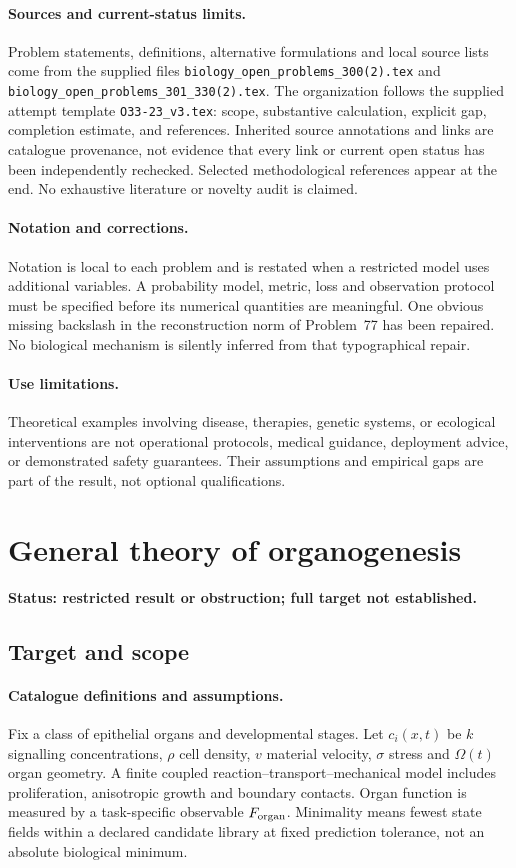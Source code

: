 \documentclass[11pt]{article}
\begin{document}
\paragraph{Sources and current-status limits.}
Problem statements, definitions, alternative formulations and local source lists
come from the supplied files
\texttt{biology\_open\_problems\_300(2).tex} and
\texttt{biology\_open\_problems\_301\_330(2).tex}.
The organization follows the supplied attempt template
\texttt{O33-23\_v3.tex}: scope, substantive calculation, explicit gap,
completion estimate, and references. Inherited source annotations and links are
catalogue provenance, not evidence that every link or current open status has
been independently rechecked. Selected methodological references appear at the
end. No exhaustive literature or novelty audit is claimed.

\paragraph{Notation and corrections.}
Notation is local to each problem and is restated when a restricted model uses
additional variables. A probability model, metric, loss and observation protocol
must be specified before its numerical quantities are meaningful. One obvious
missing backslash in the reconstruction norm of Problem~77 has been repaired.
No biological mechanism is silently inferred from that typographical repair.

\paragraph{Use limitations.}
Theoretical examples involving disease, therapies, genetic systems, or ecological
interventions are not operational protocols, medical guidance, deployment advice,
or demonstrated safety guarantees. Their assumptions and empirical gaps are part
of the result, not optional qualifications.


\section*{General theory of organogenesis}
\label{prob:127}
\noindent\textbf{Status: restricted result or obstruction; full target not established.}
\subsection{Target and scope}
\paragraph{Catalogue definitions and assumptions.}
Fix a class of epithelial organs and developmental stages. Let $c_i(x,t)$ be $k$ signalling concentrations, $\rho$ cell density, $v$ material velocity, $\sigma$ stress and $\Omega(t)$ organ geometry. A finite coupled reaction--transport--mechanical model includes proliferation, anisotropic growth and boundary contacts. Organ function is measured by a task-specific observable $F_{\rm organ}$. Minimality means fewest state fields within a declared candidate library at fixed prediction tolerance, not an absolute biological minimum.
\end{document}
